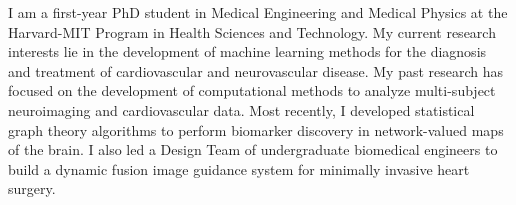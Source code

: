\documentclass[11pt, letterpaper, sans, citecolor=blue, colorlinks=true, urlcolor=blue]{moderncv}
\begin{document}
\makecvtitle
\vspace*{-1.5\baselineskip}
I am a first-year PhD student in Medical Engineering and Medical Physics at the Harvard-MIT Program in Health Sciences and Technology. My current research interests lie in the development of machine learning methods for the diagnosis and treatment of cardiovascular and neurovascular disease.
My past research has focused on the development of computational methods to analyze multi-subject neuroimaging and cardiovascular data. Most recently, I developed statistical graph theory algorithms to perform biomarker discovery in network-valued maps of the brain.
I also led a Design Team of undergraduate biomedical engineers to build a dynamic fusion image guidance system for minimally invasive heart surgery.


% 




% 

\end{document}

